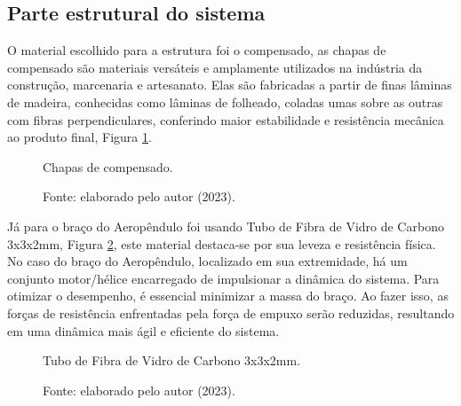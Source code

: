\subsection{ Parte estrutural do sistema}

 O material escolhido para a estrutura foi o compensado, as chapas de compensado são materiais versáteis e amplamente utilizados na indústria da construção, marcenaria e artesanato. Elas são fabricadas a partir de finas lâminas de madeira, conhecidas como lâminas de folheado, coladas umas sobre as outras com fibras perpendiculares, conferindo maior estabilidade e resistência mecânica ao produto final, Figura \ref{fig3:image_02}.


\begin{figure}[!h]
	\centering
	\caption{Chapas de compensado.}
	\caption*{Fonte: elaborado pelo autor (2023).}
	\label{fig3:image_02}
\end{figure}

\newpage
 Já para o braço do Aeropêndulo foi usando Tubo de Fibra de Vidro de Carbono 3x3x2mm, Figura \ref{fig3:image_03}, este material destaca-se por sua leveza e resistência física. No caso do braço do Aeropêndulo, localizado em sua extremidade, há um conjunto motor/hélice encarregado de impulsionar a dinâmica do sistema. Para otimizar o desempenho, é essencial minimizar a massa do braço. Ao fazer isso, as forças de resistência enfrentadas pela força de empuxo serão reduzidas, resultando em uma dinâmica mais ágil e eficiente do sistema.

\begin{figure}[!h]
	\centering
	\caption{Tubo de Fibra de Vidro de Carbono 3x3x2mm.}
	\caption*{Fonte: elaborado pelo autor (2023).}
	\label{fig3:image_03}
\end{figure}


